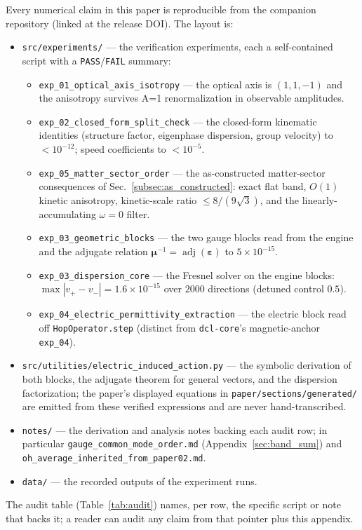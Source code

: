 \label{sec:code_and_data}

Every numerical claim in this paper is reproducible from the companion
repository (linked at the release DOI). The layout is:

\begin{itemize}
  \item \texttt{src/experiments/} --- the verification experiments, each a
    self-contained script with a \texttt{PASS}/\texttt{FAIL} summary:
    \begin{itemize}
      \item \texttt{exp\_01\_optical\_axis\_isotropy} --- the optical axis is
        $(1,1,-1)$ and the anisotropy survives A=1 renormalization in observable
        amplitudes.
      \item \texttt{exp\_02\_closed\_form\_split\_check} --- the closed-form
        kinematic identities (structure factor, eigenphase dispersion, group
        velocity) to $<10^{-12}$; speed coefficients to $<10^{-5}$.
      \item \texttt{exp\_05\_matter\_sector\_order} --- the as-constructed
        matter-sector consequences of Sec.~\ref{subsec:as_constructed}: exact
        flat band, $O(1)$ kinetic anisotropy, kinetic-scale ratio
        $\le 8/(9\sqrt3)$, and the linearly-accumulating $\omega=0$ filter.
      \item \texttt{exp\_03\_geometric\_blocks} --- the two gauge blocks read
        from the engine and the adjugate relation $\boldsymbol{\mu}^{-1} =
        \operatorname{adj}(\boldsymbol{\varepsilon})$ to $5\times10^{-15}$.
      \item \texttt{exp\_03\_dispersion\_core} --- the Fresnel solver on the
        engine blocks: $\max|v_+-v_-| = 1.6\times10^{-15}$ over $2000$
        directions (detuned control $0.5$).
      \item \texttt{exp\_04\_electric\_permittivity\_extraction} --- the electric
        block read off \texttt{HopOperator.step} (distinct from \texttt{dcl-core}'s
        magnetic-anchor \texttt{exp\_04}).
    \end{itemize}
  \item \texttt{src/utilities/electric\_induced\_action.py} --- the symbolic
    derivation of both blocks, the adjugate theorem for general vectors, and the
    dispersion factorization; the paper's displayed equations in
    \texttt{paper/sections/generated/} are emitted from these verified
    expressions and are never hand-transcribed.
  \item \texttt{notes/} --- the derivation and analysis notes backing each audit
    row; in particular \texttt{gauge\_common\_mode\_order.md}
    (Appendix~\ref{sec:band_sum}) and \texttt{oh\_average\_inherited\_from\_paper02.md}.
  \item \texttt{data/} --- the recorded outputs of the experiment runs.
\end{itemize}

The audit table (Table~\ref{tab:audit}) names, per row, the specific script or
note that backs it; a reader can audit any claim from that pointer plus this
appendix.
